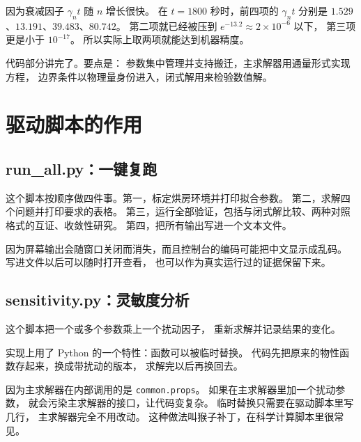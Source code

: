 因为衰减因子 $\gamma_nt$ 随 $n$ 增长很快。
在 $t=1800$ 秒时，前四项的 $\gamma_nt$ 分别是
$1.529$、$13.191$、$39.483$、$80.742$。
第二项就已经被压到 $e^{-13.2}\approx2\times10^{-6}$ 以下，
第三项更是小于 $10^{-17}$。
所以实际上取两项就能达到机器精度。

\keypoint
代码部分讲完了。要点是：
参数集中管理并支持搬迁，主求解器用通量形式实现方程，
边界条件以物理量身份进入，闭式解用来检验数值解。

\section{驱动脚本的作用}

\subsection{run\_all.py：一键复跑}

这个脚本按顺序做四件事。第一，标定烘房环境并打印拟合参数。
第二，求解四个问题并打印要求的表格。
第三，运行全部验证，包括与闭式解比较、两种对照格式的互证、收敛性研究。
第四，把所有输出写进一个文本文件。

因为屏幕输出会随窗口关闭而消失，而且控制台的编码可能把中文显示成乱码。
写进文件以后可以随时打开查看，
也可以作为真实运行过的证据保留下来。

\subsection{sensitivity.py：灵敏度分析}

这个脚本把一个或多个参数乘上一个扰动因子，
重新求解并记录结果的变化。

实现上用了 Python 的一个特性：函数可以被临时替换。
代码先把原来的物性函数存起来，换成带扰动的版本，
求解完以后再换回去。

因为主求解器在内部调用的是 \texttt{common.props}。
如果在主求解器里加一个扰动参数，
就会污染主求解器的接口，让代码变复杂。
临时替换只需要在驱动脚本里写几行，
主求解器完全不用改动。
这种做法叫猴子补丁，在科学计算脚本里很常见。
